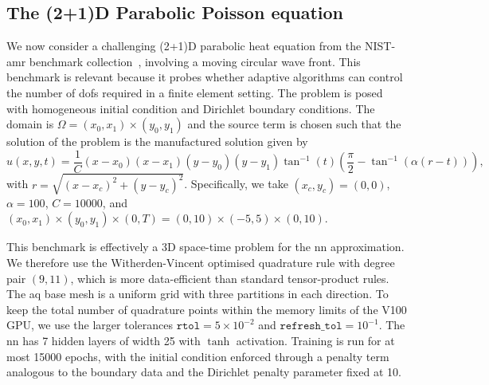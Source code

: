 \documentclass[oneside,reqno,11pt,a4paper]{amsart}
\theoremstyle{definition}
\begin{document}
\subsection{The (2+1)D Parabolic Poisson equation}

We now consider a challenging (2+1)D parabolic heat equation from the
NIST-\ac{amr} benchmark collection~\cite{NISTAMR}, involving a moving circular
wave front. This benchmark is relevant because it probes whether adaptive
algorithms can control the number of \acp{dof} required in a finite element setting. 
The problem is posed with homogeneous initial condition and
Dirichlet boundary conditions.
The domain is $\Omega = (x_0, x_1) \times (y_0, y_1)$ and the source term is chosen such that the solution of the problem is the
manufactured solution given by
\begin{equation}
u(x,y,t) = \frac{1}{C} (x - x_0)(x - x_1)(y - y_0)(y - y_1)\tan^{-1}(t)\left(\frac{\pi}{2} - \tan^{-1}\left(\alpha (r -t) \right) \right),
\end{equation}
with $r = \sqrt{\left(x - x_c\right)^2 + \left(y - y_c\right)^2}$.
Specifically, we take $\left(x_c , y_c\right) = (0,0)$, $\alpha = 100$,
$C = 10000$, and
$(x_0, x_1) \times (y_0, y_1) \times (0,T) = (0,10) \times (-5,5) \times (0,10)$.

This benchmark is effectively a 3D space-time problem for the \ac{nn}
approximation. We therefore use the Witherden-Vincent optimised quadrature rule
\cite{WitherdenVincent2015} with degree pair $(9,11)$, which is more
data-efficient than standard tensor-product rules. The \ac{aq} base mesh is a
uniform grid with three partitions in each direction. To keep the total number
of quadrature points within the memory limits of the V100 GPU, we use the
larger tolerances $\texttt{rtol} = 5 \times 10^{-2}$ and
$\texttt{refresh\_tol} = 10^{-1}$. The \ac{nn} has 7 hidden layers of
width 25 with $\tanh$ activation. Training is run for at most \num{15000}
epochs, with the initial condition enforced through a penalty term analogous to
the boundary data and the Dirichlet penalty parameter fixed at 10.
\end{document}
